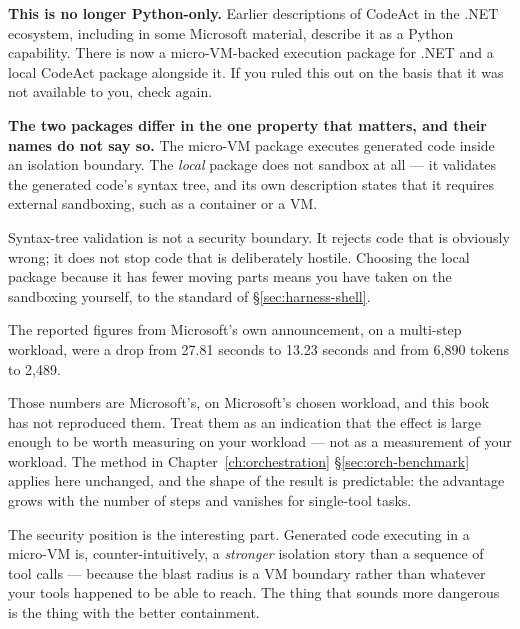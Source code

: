 \begin{versionbox}
\textbf{This is no longer Python-only.} Earlier descriptions of CodeAct in the
.NET ecosystem, including in some Microsoft material, describe it as a Python
capability. There is now a micro-VM-backed execution package for .NET and a
local CodeAct package alongside it. If you ruled this out on the basis that it
was not available to you, check again.
\end{versionbox}

\begin{warning}
\textbf{The two packages differ in the one property that matters, and their names
do not say so.} The micro-VM package executes generated code inside an isolation
boundary. The \emph{local} package does not sandbox at all --- it validates the
generated code's syntax tree, and its own description states that it requires
external sandboxing, such as a container or a VM.

Syntax-tree validation is not a security boundary. It rejects code that is
obviously wrong; it does not stop code that is deliberately hostile. Choosing the
local package because it has fewer moving parts means you have taken on the
sandboxing yourself, to the standard of \S\ref{sec:harness-shell}.
\end{warning}

The reported figures from Microsoft's own announcement, on a multi-step
workload, were a drop from 27.81 seconds to 13.23 seconds and from 6,890 tokens
to 2,489.

\begin{warning}
Those numbers are Microsoft's, on Microsoft's chosen workload, and this book has
not reproduced them. Treat them as an indication that the effect is large enough
to be worth measuring on your workload --- not as a measurement of your workload.
The method in Chapter~\ref{ch:orchestration} \S\ref{sec:orch-benchmark} applies
here unchanged, and the shape of the result is predictable: the advantage grows
with the number of steps and vanishes for single-tool tasks.
\end{warning}

The security position is the interesting part. Generated code executing in a
micro-VM is, counter-intuitively, a \emph{stronger} isolation story than a
sequence of tool calls --- because the blast radius is a VM boundary rather than
whatever your tools happened to be able to reach. The thing that sounds more
dangerous is the thing with the better containment.

